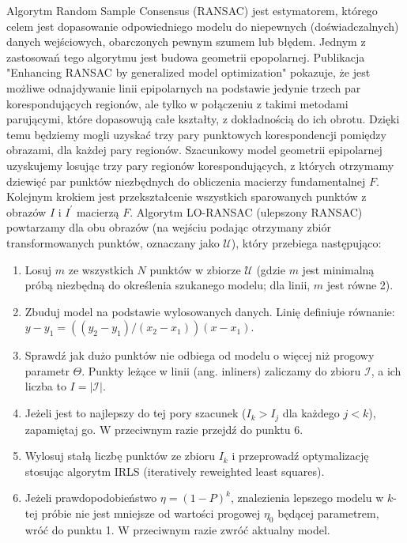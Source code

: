 Algorytm Random Sample Consensus (RANSAC) \cite{ransac} jest estymatorem,
którego celem jest dopasowanie odpowiedniego modelu do niepewnych
(doświadczalnych) danych wejściowych, obarczonych pewnym szumem lub błędem.
Jednym z zastosowań tego algorytmu jest budowa geometrii epopolarnej.
Publikacja "Enhancing RANSAC by generalized model optimization" \cite{loransac}
pokazuje, że jest możliwe odnajdywanie linii epipolarnych na podstawie jedynie
trzech par korespondujących regionów, ale tylko w połączeniu z takimi metodami
parującymi, które dopasowują całe kształty, z dokładnością do ich obrotu.
Dzięki temu będziemy mogli uzyskać trzy pary punktowych korespondencji pomiędzy
obrazami, dla każdej pary regionów.  Szacunkowy model geometrii epipolarnej
uzyskujemy losując trzy pary regionów korespondujących, z których otrzymamy
dziewięć par punktów niezbędnych do obliczenia macierzy fundamentalnej $F$.
Kolejnym krokiem jest przekształcenie wszystkich sparowanych punktów z obrazów
$I$ i $I^\prime$ macierzą $F$.  Algorytm LO-RANSAC \cite{loransac} (ulepszony
RANSAC) powtarzamy dla obu obrazów (na wejściu podając otrzymany zbiór
transformowanych punktów, oznaczany jako $\mathcal{U}$), który przebiega
następująco: \begin{enumerate} \item Losuj $m$ ze wszystkich $N$ punktów w
    zbiorze $\mathcal{U}$ (gdzie $m$ jest minimalną próbą niezbędną do
    określenia szukanego modelu; dla linii, $m$ jest równe 2). \item Zbuduj
    model na podstawie wylosowanych danych. Linię definiuje równanie: $y - y_1
    = (( y_2 - y_1 ) / ( x_2 - x_1 )) (x - x_1)$.  \item Sprawdź jak dużo
    punktów nie odbiega od modelu o więcej niż progowy parametr $\Theta$.
    Punkty leżące w linii (ang. inliners) zaliczamy do zbioru $\mathcal{I}$, a
    ich liczba to $I = |\mathcal{I}|$.  \item Jeżeli jest to najlepszy do tej
    pory szacunek ($I_k > I_j$ dla każdego $j < k$), zapamiętaj go. W
    przeciwnym razie przejdź do punktu 6. \item Wylosuj stałą liczbę punktów ze
    zbioru $I_k$ i przeprowadź optymalizację stosując algorytm IRLS
    (iteratively reweighted least squares). \item Jeżeli prawdopodobieństwo
    $\eta = (1-P)^k$, znalezienia lepszego modelu w $k$-tej próbie nie jest
    mniejsze od wartości progowej $\eta_0$ będącej parametrem, wróć do punktu
    1. W przeciwnym razie zwróć aktualny model. \end{enumerate}

